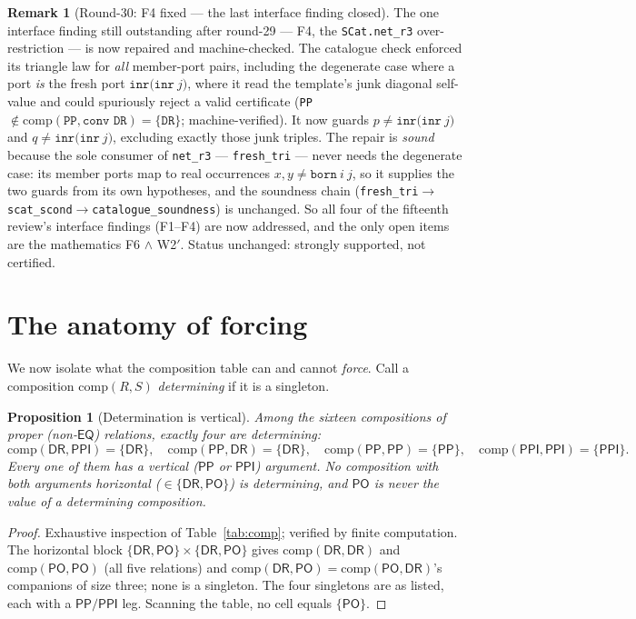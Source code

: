 \documentclass[11pt]{article}
\newcommand{\Comp}{\mathrm{comp}}
\newcommand{\code}[1]{\texttt{#1}}
\newcommand{\DR}{\mathsf{DR}}
\newcommand{\PO}{\mathsf{PO}}
\newcommand{\PP}{\mathsf{PP}}
\newcommand{\PPI}{\mathsf{PPI}}
\newcommand{\EQ}{\mathsf{EQ}}
\theoremstyle{plain}
\newtheorem{proposition}[theorem]{Proposition}
\theoremstyle{definition}
\newtheorem{remark}[theorem]{Remark}
\begin{document}
\begin{remark}[Round-30: F4 fixed --- the last interface finding closed]
The one interface finding still outstanding after round-29 --- F4, the
\code{SCat.net\_r3} over-restriction --- is now repaired and
machine-checked. The catalogue check enforced its triangle law for
\emph{all} member-port pairs, including the degenerate case where a port
\emph{is} the fresh port $\mathtt{inr(inr\ }j)$, where it read the
template's junk diagonal self-value and could spuriously reject a valid
certificate (\code{PP}$\notin\Comp(\code{PP},\code{conv DR})=\{\code{DR}\}$;
machine-verified). It now guards $p\neq\mathtt{inr(inr\ }j)$ and
$q\neq\mathtt{inr(inr\ }j)$, excluding exactly those junk triples. The
repair is \emph{sound} because the sole consumer of \code{net\_r3} ---
\code{fresh\_tri} --- never needs the degenerate case: its member ports
map to real occurrences $x,y\neq\mathtt{born}\ i\ j$, so it supplies the
two guards from its own hypotheses, and the soundness chain
(\code{fresh\_tri}$\to$\code{scat\_scond}$\to$\code{catalogue\_soundness})
is unchanged. So all four of the fifteenth review's interface findings
(F1--F4) are now addressed, and the only open items are the mathematics
F6 $\wedge$ W2$'$. Status unchanged: strongly supported, not certified.
\end{remark}

\section{The anatomy of forcing}\label{sec:anatomy}

We now isolate what the composition table can and cannot \emph{force}.
Call a composition $\Comp(R,S)$ \emph{determining} if it is a singleton.

\begin{proposition}[Determination is vertical]\label{prop:singletons}
Among the sixteen compositions of proper (non-$\EQ$) relations, exactly
four are determining:
\[
\Comp(\DR,\PPI)=\{\DR\},\quad
\Comp(\PP,\DR)=\{\DR\},\quad
\Comp(\PP,\PP)=\{\PP\},\quad
\Comp(\PPI,\PPI)=\{\PPI\}.
\]
Every one of them has a vertical ($\PP$ or $\PPI$) argument. No
composition with both arguments horizontal ($\in\{\DR,\PO\}$) is
determining, and $\PO$ is never the value of a determining composition.
\end{proposition}

\begin{proof}
Exhaustive inspection of Table~\ref{tab:comp}; verified by finite
computation. The horizontal block $\{\DR,\PO\}\times\{\DR,\PO\}$ gives
$\Comp(\DR,\DR)$ and $\Comp(\PO,\PO)$ (all five relations) and
$\Comp(\DR,\PO)=\Comp(\PO,\DR)$'s companions of size three; none is a
singleton. The four singletons are as listed, each with a $\PP/\PPI$
leg. Scanning the table, no cell equals $\{\PO\}$.
\end{proof}
\end{document}
